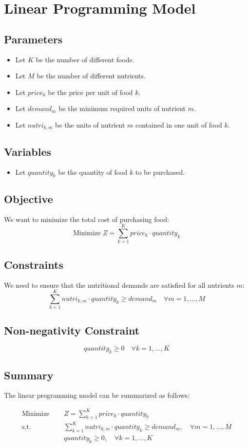 \documentclass{article}
\begin{document}
\section*{Linear Programming Model}

\subsection*{Parameters}
\begin{itemize}
    \item Let \( K \) be the number of different foods.
    \item Let \( M \) be the number of different nutrients.
    \item Let \( price_k \) be the price per unit of food \( k \).
    \item Let \( demand_m \) be the minimum required units of nutrient \( m \).
    \item Let \( nutri_{k,m} \) be the units of nutrient \( m \) contained in one unit of food \( k \).
\end{itemize}

\subsection*{Variables}
\begin{itemize}
    \item Let \( quantity_k \) be the quantity of food \( k \) to be purchased.
\end{itemize}

\subsection*{Objective}
We want to minimize the total cost of purchasing food:
\[
\text{Minimize } Z = \sum_{k=1}^{K} price_k \cdot quantity_k
\]

\subsection*{Constraints}
We need to ensure that the nutritional demands are satisfied for all nutrients \( m \):
\[
\sum_{k=1}^{K} nutri_{k,m} \cdot quantity_k \geq demand_m \quad \forall m = 1, \ldots, M
\]

\subsection*{Non-negativity Constraint}
\[
quantity_k \geq 0 \quad \forall k = 1, \ldots, K
\]

\subsection*{Summary}
The linear programming model can be summarized as follows:

\begin{align*}
    \text{Minimize } & \quad Z = \sum_{k=1}^{K} price_k \cdot quantity_k \\
    \text{s.t. } & \quad \sum_{k=1}^{K} nutri_{k,m} \cdot quantity_k \geq demand_m, \quad \forall m = 1, \ldots, M \\
    & \quad quantity_k \geq 0, \quad \forall k = 1, \ldots, K
\end{align*}
\end{document}
